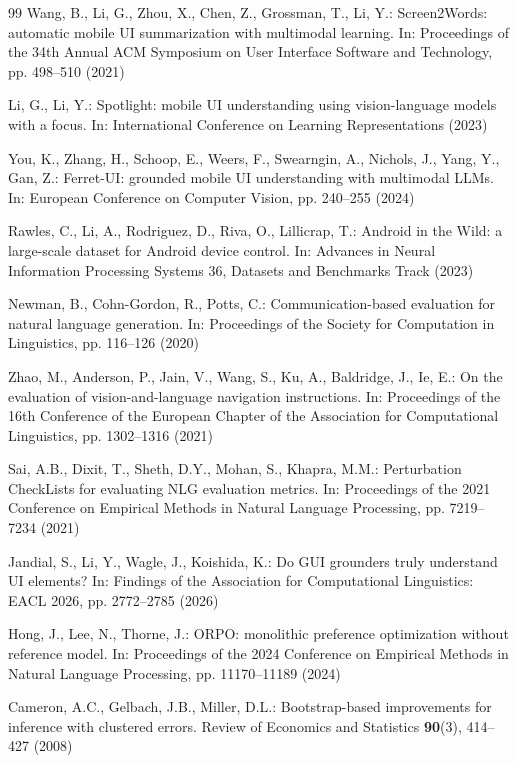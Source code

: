 \documentclass[runningheads,a4paper]{llncs}
\begin{document}
\begin{thebibliography}{99}
Wang, B., Li, G., Zhou, X., Chen, Z., Grossman, T., Li, Y.: Screen2Words: automatic mobile UI
summarization with multimodal learning. In: Proceedings of the 34th Annual ACM Symposium on User
Interface Software and Technology, pp. 498--510 (2021)

Li, G., Li, Y.: Spotlight: mobile UI understanding using vision-language models with a focus.
In: International Conference on Learning Representations (2023)

You, K., Zhang, H., Schoop, E., Weers, F., Swearngin, A., Nichols, J., Yang, Y., Gan, Z.:
Ferret-UI: grounded mobile UI understanding with multimodal LLMs. In: European Conference on
Computer Vision, pp. 240--255 (2024)

Rawles, C., Li, A., Rodriguez, D., Riva, O., Lillicrap, T.: Android in the Wild: a large-scale
dataset for Android device control. In: Advances in Neural Information Processing Systems 36,
Datasets and Benchmarks Track (2023)

Newman, B., Cohn-Gordon, R., Potts, C.: Communication-based evaluation for natural language
generation. In: Proceedings of the Society for Computation in Linguistics, pp. 116--126 (2020)

Zhao, M., Anderson, P., Jain, V., Wang, S., Ku, A., Baldridge, J., Ie, E.: On the evaluation of
vision-and-language navigation instructions. In: Proceedings of the 16th Conference of the
European Chapter of the Association for Computational Linguistics, pp. 1302--1316 (2021)

Sai, A.B., Dixit, T., Sheth, D.Y., Mohan, S., Khapra, M.M.: Perturbation CheckLists for evaluating
NLG evaluation metrics. In: Proceedings of the 2021 Conference on Empirical Methods in Natural
Language Processing, pp. 7219--7234 (2021)

Jandial, S., Li, Y., Wagle, J., Koishida, K.: Do GUI grounders truly understand UI elements?
In: Findings of the Association for Computational Linguistics: EACL 2026, pp. 2772--2785 (2026)

Hong, J., Lee, N., Thorne, J.: ORPO: monolithic preference optimization without reference model.
In: Proceedings of the 2024 Conference on Empirical Methods in Natural Language Processing,
pp. 11170--11189 (2024)

Cameron, A.C., Gelbach, J.B., Miller, D.L.: Bootstrap-based improvements for inference with
clustered errors. Review of Economics and Statistics \textbf{90}(3), 414--427 (2008)


\end{thebibliography}
\end{document}
